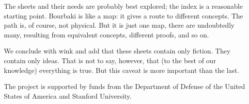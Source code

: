 The sheets and their needs are probably
best explored;
the index is
a reasonable starting point.
Bourbaki is like a map: it gives
a route to different concepts.
The path is, of course, not physical.
But it is just one map, there are
undoubtedly many, resulting from
equivalent concepts, different proofs,
and so on.

We conclude with wink and add that these
sheets contain only fiction.
They contain only ideas.
That is not to say, however, that
(to the best of our knowledge)
everything is true.
But this caveat is more important
than the last.



\vfill

\begin{center}{\small The project is supported by
funds from the Department of
Defense of the United States of America
and Stanford University.}\end{center}
\strats

